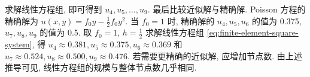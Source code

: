 {求解线性方程组, 即可得到 $u_4,u_5,\ldots,u_9$.}
{最后比较近似解与精确解. Poisson 方程的精确解为 $u(x,y)=f_0y-\frac12f_0y^2$. 当 $f_0=1$ 时, 精确解的 $u_4,u_5,u_6$ 的值为 0.375, $u_7,u_8,u_9$ 的值为 0.5. 取 $f_0=1$, $h=\frac12$ 求解线性方程组 \eqref{eq:finite-element-square-system}, 得 $u_4\approx0.381,u_5\approx0.375,u_6\approx0.369$ 和 $u_7\approx0.524,u_8\approx0.500,u_9\approx0.476$.}
{若需要更精确的近似解, 应增加节点数. 由上述推导可见, 线性方程组的规模与整体节点数几乎相同.}
